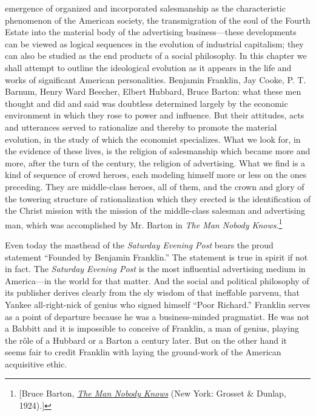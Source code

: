 \documentclass[openany,nobib]{tufte-book}
\begin{document}
 emergence of organized and incorporated salesmanship as the
characteristic phenomenon of the American society, the transmigration of
the soul of the Fourth Estate into the material body of the advertising
business---these developments can be viewed as logical sequences in the
evolution of industrial capitalism; they can also be studied as the end
products of a social philosophy. In this chapter we shall attempt to
outline the ideological evolution as it appears in the life and works of
significant American personalities. Benjamin Franklin, Jay Cooke, P. T.
Barnum, Henry Ward Beecher, Elbert Hubbard, Bruce Barton: what these men
thought and did and said was doubtless determined largely by the
economic environment in which they rose to power and influence. But
their attitudes, acts and utterances served to rationalize and thereby
to promote the material evolution, in the study of which the economist
specializes. What we look for, in the evidence of these lives, is the
religion of salesmanship which became more and more, after the turn of
the century, the religion of advertising. What we find is a kind of
sequence of crowd heroes, each modeling himself more or less on the ones
preceding. They are middle-class heroes, all of them, and the crown and
glory of the towering structure of rationalization which they erected is
the identification of the Christ mission with the mission of the
middle-class salesman and advertising man, which was accomplished by Mr.
Barton in \emph{The Man Nobody Knows}.\footnote{{[}Bruce Barton,
  \emph{\href{http://www.worldcat.org/oclc/70421692}{The Man Nobody
  Knows}} (New York: Grosset \& Dunlap, 1924).{]}}

Even today the masthead of the \emph{Saturday Evening Post} bears the
proud statement ``Founded by Benjamin Franklin.'' The statement is true
in spirit if not in fact. The \emph{Saturday Evening Post} is the most
influential advertising medium in America---in the world for that
matter. And the social and political philosophy of its publisher derives
clearly from the sly wisdom of that ineffable parvenu, that Yankee
all-right-nick of genius who signed himself ``Poor Richard.'' Franklin
serves as a point of departure because he was a business-minded
pragmatist. He was not a Babbitt and it is impossible to conceive of
Franklin, a man of genius, playing the r\^ole of a Hubbard or a Barton a
century later. But on the other hand it seems fair to credit Franklin
with laying the ground-work of the American acquisitive ethic.
\end{document}
